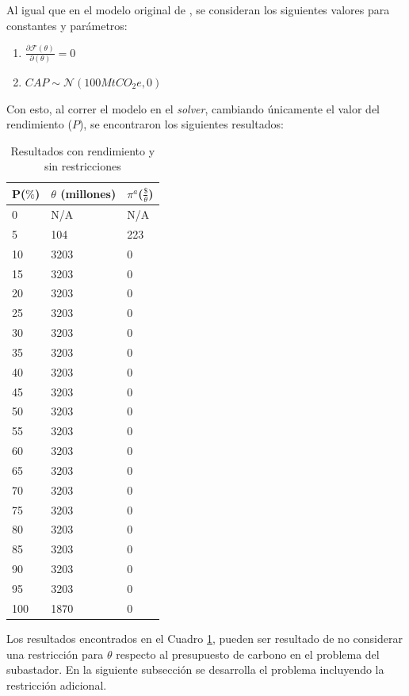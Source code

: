 Al igual que en el modelo original de , se consideran los siguientes valores para constantes y parámetros:
\begin{enumerate}
    \item $\frac{\partial\mathcal{F}(\theta)}{\partial(\theta)}=0$
    \item $CAP\sim \mathcal{N}(100MtCO_{2}e,0)$
\end{enumerate}

Con esto, al correr el modelo en el \textit{solver}, cambiando únicamente el valor del rendimiento ($P$), se encontraron los siguientes resultados:

\begin{table}[H]
\centering
\begin{tabular}{|l|l|l|}
\hline
\textbf{P($\%$)} & \textbf{$\theta$ (millones)} & \textbf{$\pi^a$($\frac{\$}{\theta}$)} \\ \hline
0 & N/A & N/A \\ \hline
5 & 104 & 223 \\ \hline
10 & 3203 & 0 \\ \hline
15 & 3203 & 0 \\ \hline
20 & 3203 & 0 \\ \hline
25 & 3203 & 0 \\ \hline
30 & 3203 & 0 \\ \hline
35 & 3203 & 0 \\ \hline
40 & 3203 & 0 \\ \hline
45 & 3203 & 0 \\ \hline
50 & 3203 & 0 \\ \hline
55 & 3203 & 0 \\ \hline
60 & 3203 & 0 \\ \hline
65 & 3203 & 0 \\ \hline
70 & 3203 & 0 \\ \hline
75 & 3203 & 0 \\ \hline
80 & 3203 & 0 \\ \hline
85 & 3203 & 0 \\ \hline
90 & 3203 & 0 \\ \hline
95 & 3203 & 0 \\ \hline
100 & 1870 & 0 \\ \hline
\end{tabular}
\caption{Resultados con rendimiento y sin restricciones}
\label{tabla:sinrestr}
\end{table}


Los resultados encontrados en el Cuadro \ref{tabla:sinrestr}, pueden ser resultado de no considerar una restricción para $\theta$ respecto al presupuesto de carbono en el problema del subastador. En la siguiente subsección se desarrolla el problema incluyendo la restricción adicional.

